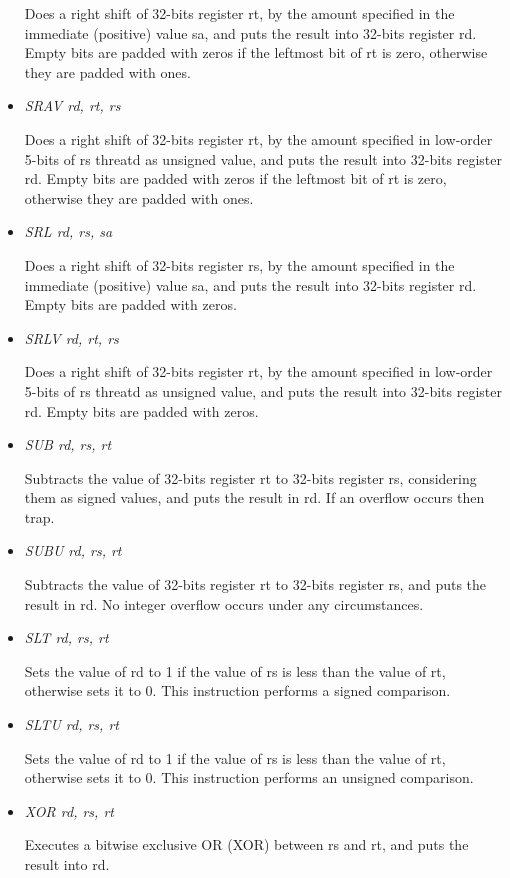 \documentclass[letterpaper,10pt,english]{sphinxmanual}
\begin{document}
\begin{itemize}
Does a right shift of 32-bits register rt, by the amount specified in the immediate (positive) value sa, and puts the result into 32-bits register rd. Empty bits are padded with zeros if the leftmost bit of rt is zero, otherwise they are padded with ones.

\item {} 
\emph{SRAV rd, rt, rs}

Does a right shift of 32-bits register rt, by the amount specified in low-order 5-bits of rs threatd as unsigned value, and puts the result into 32-bits register rd. Empty bits are padded with zeros if the leftmost bit of rt is zero, otherwise they are padded with ones.

\item {} 
\emph{SRL rd, rs, sa}

Does a right shift of 32-bits register rs, by the amount specified in the immediate (positive) value sa, and puts the result into 32-bits register rd. Empty bits are padded with zeros.

\item {} 
\emph{SRLV rd, rt, rs}

Does a right shift of 32-bits register rt, by the amount specified in low-order 5-bits of rs threatd as unsigned value, and puts the result into 32-bits register rd. Empty bits are padded with zeros.

\item {} 
\emph{SUB rd, rs, rt}

Subtracts the value of 32-bits register rt to 32-bits register rs, considering them as signed values, and puts the result in rd. If an overflow occurs then trap.

\item {} 
\emph{SUBU rd, rs, rt}

Subtracts the value of 32-bits register rt to 32-bits register rs, and puts the result in rd. No integer overflow occurs under any circumstances.

\end{itemize}
\begin{itemize}
\item {} 
\emph{SLT rd, rs, rt}

Sets the value of rd to 1 if the value of rs is less than the value of rt, otherwise sets it to 0. This instruction performs a signed comparison.

\item {} 
\emph{SLTU rd, rs, rt}

Sets the value of rd to 1 if the value of rs is less than the value of rt, otherwise sets it to 0. This instruction performs an unsigned comparison.

\item {} 
\emph{XOR rd, rs, rt}

Executes a bitwise exclusive OR (XOR) between rs and rt, and puts the result into rd.

\end{itemize}
\end{document}
